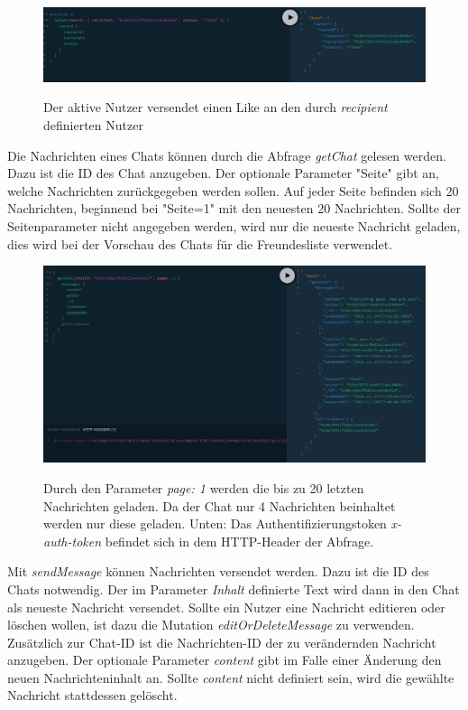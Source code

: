 \begin{figure}
	\centering
    \includegraphics[width=\textwidth]{sources/graphiql_swipe.png}\cite{}
	\caption{Der aktive Nutzer versendet einen Like an den durch \textit{recipient} definierten Nutzer}
	\label{figGQL6}
\end{figure}

Die Nachrichten eines Chats können durch die Abfrage \textit{getChat} gelesen werden. Dazu ist die ID des Chat anzugeben. Der optionale Parameter "Seite" gibt an, welche Nachrichten zurückgegeben werden sollen. Auf jeder Seite befinden sich 20 Nachrichten, beginnend bei "Seite=1" mit den neuesten 20 Nachrichten. Sollte der Seitenparameter nicht angegeben werden, wird nur die neueste Nachricht geladen, dies wird bei der Vorschau des Chats für die Freundesliste verwendet.

\begin{figure}
	\centering
    \includegraphics[width=\textwidth]{sources/graphiql_getChat.png}\cite{}
	\caption{Durch den Parameter \textit{page: 1} werden die bis zu 20 letzten Nachrichten geladen. Da der Chat nur 4 Nachrichten beinhaltet werden nur diese geladen. Unten: Das Authentifizierungstoken \textit{x-auth-token} befindet sich in dem HTTP-Header der Abfrage.}
	\label{figGQL7}
\end{figure}

Mit \textit{sendMessage} können Nachrichten versendet werden. Dazu ist die ID des Chats notwendig. Der im Parameter \textit{Inhalt} definierte Text wird dann in den Chat als neueste Nachricht versendet.
Sollte ein Nutzer eine Nachricht editieren oder löschen wollen, ist dazu die Mutation \textit{editOrDeleteMessage} zu verwenden. Zusätzlich zur Chat-ID ist die Nachrichten-ID der zu verändernden Nachricht anzugeben. Der optionale Parameter \textit{content} gibt im Falle einer Änderung den neuen Nachrichteninhalt an. Sollte \textit{content} nicht definiert sein, wird die gewählte Nachricht stattdessen gelöscht. 

